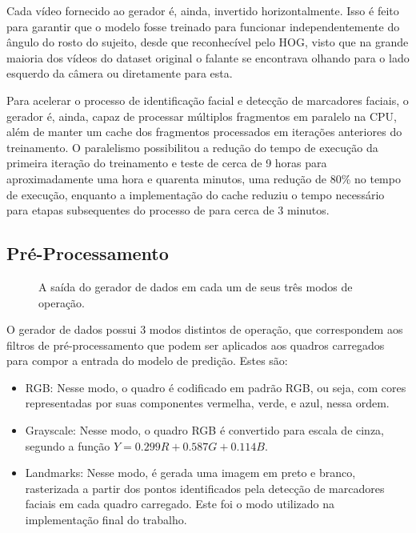 Cada vídeo fornecido ao gerador é, ainda, invertido horizontalmente.
Isso é feito para garantir que o modelo fosse treinado para funcionar independentemente do ângulo do rosto do sujeito, desde que reconhecível pelo HOG, visto que na grande maioria dos vídeos do dataset original o falante se encontrava olhando para o lado esquerdo da câmera ou diretamente para esta.

Para acelerar o processo de identificação facial e detecção de marcadores faciais, o gerador é, ainda, capaz de processar múltiplos fragmentos em paralelo na CPU, além de manter um cache dos fragmentos processados em iterações anteriores do treinamento.
O paralelismo possibilitou a redução do tempo de execução da primeira iteração do treinamento e teste de cerca de 9 horas para aproximadamente uma hora e quarenta minutos, uma redução de 80\% no tempo de execução, enquanto a implementação do cache reduziu o tempo necessário para etapas subsequentes do processo de para cerca de 3 minutos.

\subsection{Pré-Processamento}
\label{sec:pre-processing}

\begin{figure}[ht]
    \centering
    
    
    
    \caption{A saída do gerador de dados em cada um de seus três modos de operação.}
    \label{fig:generator_out}
\end{figure}

O gerador de dados possui 3 modos distintos de operação, que correspondem aos filtros de pré-processamento que podem ser aplicados aos quadros carregados para compor a entrada do modelo de predição. Estes são:

\begin{itemize}
    \item RGB: Nesse modo, o quadro é codificado em padrão RGB, ou seja, com cores representadas por suas componentes vermelha, verde, e azul, nessa ordem.
    \item Grayscale: Nesse modo, o quadro RGB é convertido para escala de cinza, segundo a função $Y = 0.299 R + 0.587 G + 0.114 B$.
    \item Landmarks: Nesse modo, é gerada uma imagem em preto e branco, rasterizada a partir dos pontos identificados pela detecção de marcadores faciais em cada quadro carregado. Este foi o modo utilizado na implementação final do trabalho.
\end{itemize}

